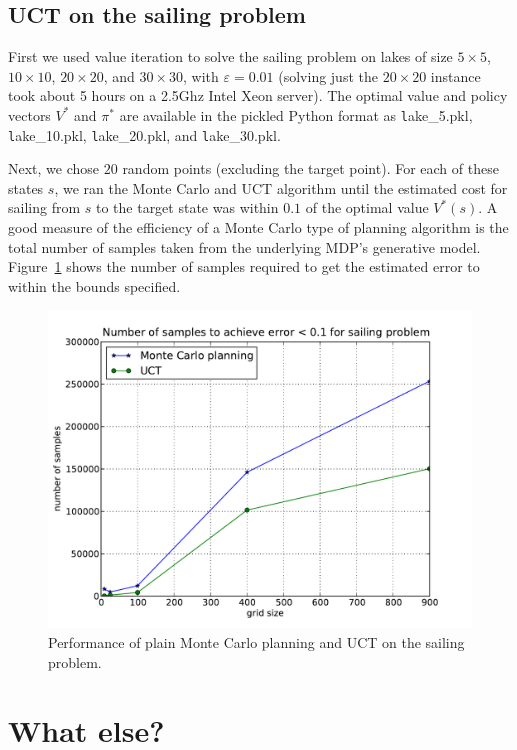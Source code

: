 \documentclass[12pt,amstags,fleqn]{article}
\theoremstyle{plain}
\theoremstyle{definition}
\theoremstyle{definition}
\begin{document}
\subsection{UCT on the sailing problem}

First we used value iteration to solve the sailing problem on lakes of size
$5 \times 5$,
$10 \times 10$, $20 \times 20$,
and $30 \times 30$, with $\varepsilon =
0.01$ (solving just the $20 \times 20$ instance took about 5
hours on a 2.5Ghz Intel Xeon server).
The optimal value and policy vectors $V^*$ and $\pi^*$ 
are available in the pickled Python format as
{\texttt lake\_5.pkl},
{\texttt lake\_10.pkl},
{\texttt lake\_20.pkl}, and
{\texttt lake\_30.pkl}.

Next, we chose $20$ random points (excluding the target point). For
each of these states $s$, we ran the Monte Carlo and UCT algorithm until the estimated
cost for sailing from $s$ to the target state was within $0.1$ of the
optimal value $V^*(s)$. A good measure of the efficiency of a Monte Carlo type of planning
algorithm is the total number of samples taken from the underlying MDP's
generative model. Figure~\ref{uctsailing} shows the number of samples
required to get the estimated error to within the bounds specified.
\begin{figure}[htb]
\begin{center}
\includegraphics[width=.75\textwidth]{nr_samples_uct_sailing.pdf}
\end{center}
\caption{Performance of plain Monte Carlo planning and UCT on the
sailing problem.}\label{uctsailing}
\end{figure}

\section{What else?}
\end{document}
